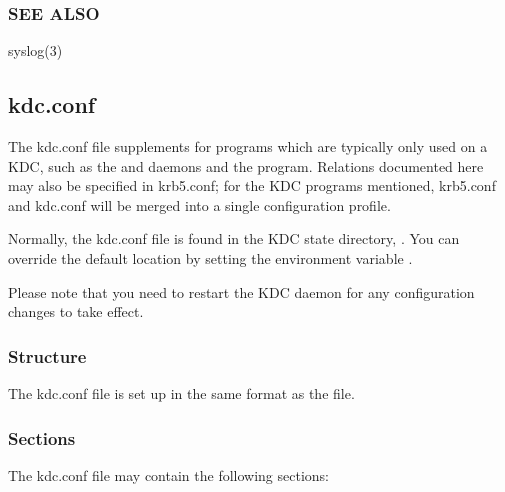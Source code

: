 \documentclass[letterpaper,10pt,english]{sphinxmanual}
\begin{document}
\subsubsection{SEE ALSO}
\label{\detokenize{admin/conf_files/krb5_conf:see-also}}
\sphinxAtStartPar
syslog(3)

\sphinxstepscope


\subsection{kdc.conf}
\label{\detokenize{admin/conf_files/kdc_conf:kdc-conf}}\label{\detokenize{admin/conf_files/kdc_conf:kdc-conf-5}}\label{\detokenize{admin/conf_files/kdc_conf::doc}}
\sphinxAtStartPar
The kdc.conf file supplements {\hyperref[\detokenize{admin/conf_files/krb5_conf:krb5-conf-5}]{}} for programs which
are typically only used on a KDC, such as the {\hyperref[\detokenize{admin/admin_commands/krb5kdc:krb5kdc-8}]{}} and
{\hyperref[\detokenize{admin/admin_commands/kadmind:kadmind-8}]{}} daemons and the {\hyperref[\detokenize{admin/admin_commands/kdb5_util:kdb5-util-8}]{}} program.
Relations documented here may also be specified in krb5.conf; for the
KDC programs mentioned, krb5.conf and kdc.conf will be merged into a
single configuration profile.

\sphinxAtStartPar
Normally, the kdc.conf file is found in the KDC state directory,
{\hyperref[\detokenize{mitK5defaults:paths}]{}}.  You can override the default location by setting the
environment variable .

\sphinxAtStartPar
Please note that you need to restart the KDC daemon for any configuration
changes to take effect.


\subsubsection{Structure}
\label{\detokenize{admin/conf_files/kdc_conf:structure}}
\sphinxAtStartPar
The kdc.conf file is set up in the same format as the
{\hyperref[\detokenize{admin/conf_files/krb5_conf:krb5-conf-5}]{}} file.


\subsubsection{Sections}
\label{\detokenize{admin/conf_files/kdc_conf:sections}}
\sphinxAtStartPar
The kdc.conf file may contain the following sections:
\end{document}
